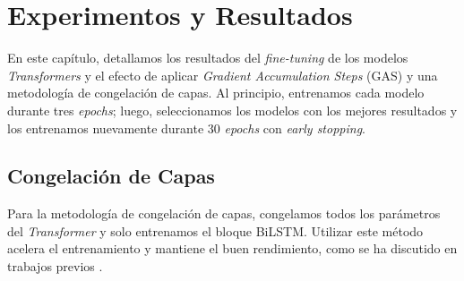 \chapter{Experimentos y Resultados}
\label{cap:resultados}




En este capítulo, detallamos los resultados del \textit{fine-tuning} de los modelos \textit{Transformers} y el efecto de aplicar \textit{Gradient Accumulation Steps} (GAS)  y una metodología de congelación de capas. Al principio, entrenamos cada modelo durante tres \textit{epochs}; luego, seleccionamos los modelos con los mejores resultados y los entrenamos nuevamente durante 30 \textit{epochs} con \textit{early stopping}.

\section{Congelación de Capas}

Para la metodología de congelación de capas, congelamos todos los parámetros del \textit{Transformer} y solo entrenamos el bloque BiLSTM. Utilizar este método acelera el entrenamiento y mantiene el buen rendimiento, como se ha discutido en trabajos previos \citep{merchant2020happens,lee2019would,kovaleva2019revealing}.

